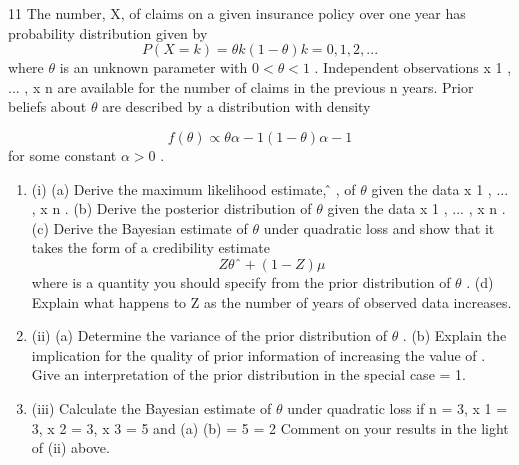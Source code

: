 \documentclass[a4paper,12pt]{article}
\begin{document}
11
The number, X, of claims on a given insurance policy over one year has probability
distribution given by
\[ P ( X = k ) = \theta  k (1 − \theta  ) k = 0, 1, 2, ...\]
where $\theta$   is an unknown parameter with $0 < \theta  < 1$ .
Independent observations x 1 , ... , x n are available for the number of claims in the previous n years. Prior beliefs about $\theta$   are described by a distribution with density

\[ f ( \theta  ) \propto \theta  \alpha − 1 (1 − \theta  ) \alpha − 1\]
for some constant $\alpha  > 0$ .

\begin{enumerate}
\item (i)
(a) Derive the maximum likelihood estimate, \theta ̂ , of $\theta$   given the data x 1 , ... , x n .
(b) Derive the posterior distribution of $\theta$  given the data x 1 , ... , x n .
(c) Derive the Bayesian estimate of $\theta$   under quadratic loss and show that it takes the form of a credibility estimate
\[Z \theta  ˆ + (1 − Z ) \mu \]
where \mu  is a quantity you should specify from the prior distribution of
$\theta$  .
(d)
Explain what happens to Z as the number of years of observed data
increases.

\item (ii)
(a) Determine the variance of the prior distribution of $\theta$  .
(b) Explain the implication for the quality of prior information of increasing the value of \alpha . Give an interpretation of the prior distribution in the special case \alpha  = 1.

\item (iii)
Calculate the Bayesian estimate of $\theta$   under quadratic loss if n = 3,
x 1 = 3, x 2 = 3, x 3 = 5 and
(a)
(b)
\alpha  = 5
\alpha  = 2
Comment on your results in the light of (ii) above.
\end{enumerate}
\newpage
\end{document}
